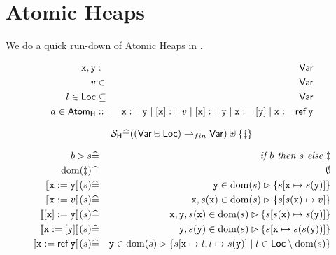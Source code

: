 \section{Atomic Heaps}

We do a quick run-down of Atomic Heaps in \cite{conf/popl/Dinsdale-YoungBGPY13}.

\begin{eqnarray*}
   \mathtt{x},\mathtt{y} &:& \mathsf{Var}
\\ v &\in& \mathsf{Var}
\\ l \in \mathsf{Loc} &\subseteq& \mathsf{Var}
\\ a \in \mathsf{Atom_{H}}
   &::=&
   \mathtt{x} := \mathtt{y}
   \mid
   [\mathtt{x}] := v
   \mid
   [\mathtt{x}] := \mathtt{y}
   \mid
   \mathtt{x} := [\mathtt{y}]
   \mid
   \mathtt{x} := \mathop{\mathsf{ref}}\mathtt{y}
\end{eqnarray*}

\[
 \mathcal{S}_{\mathsf{H}} \widehat= ((\mathsf{Var} \uplus \mathsf{Loc}) \rightharpoonup_{fin} \mathsf{Var}) \uplus \{\ddagger\}
\]

\begin{eqnarray*}
   b \rhd s &\defs& \textit{if }b\textit{ then }s\textit{ else }\bang
\\ \dom(\bang) &\defs& \emptyset
\\ \sem{\vx:=\vy}(s)
              &\defs& \vy \in \dom(s)\rhd \setof{s[\vx \mapsto s(\vy)]}
\\ \sem{\vx:=v}(s)
              &\defs& \vx,s(\vx) \in \dom(s)\rhd \setof{s[s(\vx) \mapsto v]}
\\ \sem{[\vx]:=\vy}(s)
              &\defs& \vx,\vy,s(\vx) \in \dom(s)\rhd \setof{s[s(\vx) \mapsto s(\vy)]}
\\ \sem{\vx:=[\vy]}(s)
              &\defs& \vy,s(\vy) \in \dom(s)\rhd \setof{s[\vx \mapsto s(s(\vy))]}
\\ \sem{\vx:=\reft\vy}(s)
              &\defs& \vy \in \dom(s)\rhd
              \setof{s[\vx \mapsto l,l \mapsto s(\vy)] \mid l \in \Loc \setminus \dom(s) }
\end{eqnarray*}
